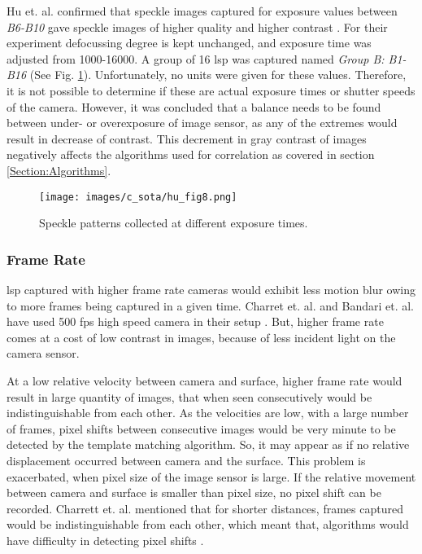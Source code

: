     \vspace{5mm}

    \noindent Hu et. al. confirmed that speckle images captured for exposure values between \emph{B6-B10} gave speckle images of higher quality and higher contrast \noindent \cite{hu}. For their experiment defocussing degree is kept unchanged, and exposure time was adjusted from 1000-16000. A group of 16 \gls{lsp} was captured named \emph{Group B: B1-B16} (See Fig. \ref{fig:hu_fig8}). Unfortunately, no units were given for these values. Therefore, it is not possible to determine if these are actual exposure times or shutter speeds of the camera. However, it was concluded that a balance needs to be found between under- or overexposure of image sensor, as any of the extremes would result in decrease of contrast. This decrement in gray contrast of images negatively affects the algorithms used for correlation as covered in section \ref{Section:Algorithms}.

    \begin{figure}[h]
        \centering
        \texttt{[image: images/c\_sota/hu\_fig8.png]}
        \caption{Speckle patterns collected at different exposure times. \cite{hu}}
        \label{fig:hu_fig8}
    \end{figure}

    \subsubsection*{Frame Rate}\label{Subsubsection:Frame_Rate}
    \Gls{lsp} captured with higher frame rate cameras would exhibit less motion blur owing to more frames being captured in a given time. Charret et. al. and Bandari et. al. have used 500 \gls{fps} high speed camera in their setup \cite{charrett_2018} \cite{bandari}. But, higher frame rate comes at a cost of low contrast in images, because of less incident light on the camera sensor. 

    \vspace{5mm}
    \noindent At a low relative velocity between camera and surface, higher frame rate would result in large quantity of images, that when seen consecutively would be indistinguishable from each other. As the velocities are low, with a large number of frames, pixel shifts between consecutive images would be very minute to be detected by the template matching algorithm. So, it may appear as if no relative displacement occurred between camera and the surface. This problem is exacerbated, when pixel size of the image sensor is large. If the relative movement between camera and surface is smaller than pixel size, no pixel shift can be recorded. Charrett et. al. mentioned that for shorter distances, frames captured would be indistinguishable from each other, which meant that, algorithms would have difficulty in detecting pixel shifts \cite{charrett_mars}.

